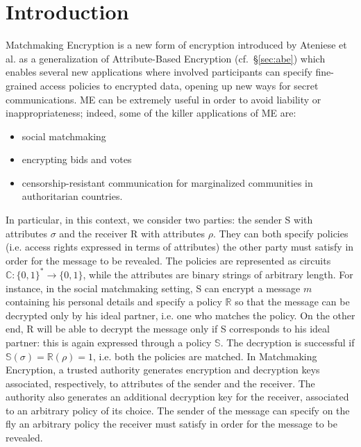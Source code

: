 \chapter{Introduction}
Matchmaking Encryption is a new form of encryption introduced by Ateniese et al. \cite{Ateniese} as a generalization of Attribute-Based Encryption (cf.\ \S\ref{sec:abe}) which enables several new applications where involved participants can specify fine-grained access policies to encrypted data, opening up new ways for secret communications.
\newline\newline
ME can be extremely useful in order to avoid liability or inappropriateness; indeed, some of the killer applications of ME are:
\begin{itemize}
    \item social matchmaking
    \item encrypting bids and votes
    \item censorship-resistant communication for marginalized communities in authoritarian countries.
\end{itemize}
In particular, in this context, we consider two parties: the sender S with attributes $\sigma$ and the receiver R with attributes $\rho$.
They can both specify policies (i.e. access rights expressed in terms of attributes) the other party must satisfy in order for the message to be revealed.
The policies are represented as circuits $\mathbb{C} : \{0, 1\}^* \to \{0, 1\}$, while the attributes are binary strings of arbitrary length.
For instance, in the social matchmaking setting, S can encrypt a message $m$ containing his personal details and specify a policy $\mathbb{R}$ so that the message can be decrypted only by his ideal partner, i.e. one who matches the policy.
On the other end, R will be able to decrypt the message only if S corresponds to his ideal partner: this is again expressed through a policy $\mathbb{S}$. The decryption is successful if $\mathbb{S}(\sigma) = \mathbb{R}(\rho) = 1$, i.e. both the policies are matched.
\newline\newline
In Matchmaking Encryption, a trusted authority generates encryption and decryption keys associated, respectively, to attributes of the sender and the receiver.
The authority also generates an additional decryption key for the receiver, associated to an arbitrary policy of its choice.
The sender of the message can specify on the fly an arbitrary policy the receiver must satisfy in order for the message to be revealed.
